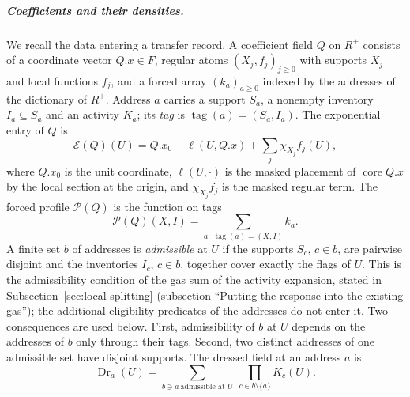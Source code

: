 \subparagraph{Coefficients and their densities.}
We recall the data entering a transfer record. A coefficient field $Q$ on $R^+$
consists of a coordinate vector $Q.x\in F$, regular atoms
$(X_j,f_j)_{j\ge0}$ with supports $X_j$ and local functions $f_j$, and
a forced array $(k_a)_{a\ge0}$ indexed by the addresses of the
dictionary of $R^+$. Address $a$ carries a support $S_a$, a nonempty
inventory $I_a\subseteq S_a$ and an activity $K_a$; its \emph{tag} is
$\operatorname{tag}(a)=(S_a,I_a)$. The exponential entry of $Q$ is
\[
 \mathcal E(Q)(U)=Q.x_0+\ell(U,Q.x)
   +\sum_j\chi_{X_j}f_j(U),
\]
where $Q.x_0$ is the unit coordinate, $\ell(U,\cdot)$ is the masked
placement of $\operatorname{core}Q.x$ by the local section at the
origin, and $\chi_{X_j}f_j$ is the masked regular term. The forced
profile $\mathcal P(Q)$ is the function on tags
\[
 \mathcal P(Q)(X,I)=\sum_{a:\ \operatorname{tag}(a)=(X,I)}k_a .
\]
A finite set $b$ of addresses is \emph{admissible} at $U$ if the
supports $S_c$, $c\in b$, are pairwise disjoint and the inventories
$I_c$, $c\in b$, together cover exactly the flags of $U$. This is the
admissibility condition of the gas sum of the activity expansion,
stated in Subsection~\ref{sec:local-splitting} (subsection ``Putting the
response into the existing gas''); the additional eligibility predicates
of the addresses do not enter it. Two consequences are used below.
First, admissibility of $b$ at $U$ depends on the addresses of $b$ only
through their tags. Second, two distinct addresses of one admissible
set have disjoint supports. The dressed field at an address $a$ is
\[
 \operatorname{Dr}_a(U)=\sum_{b\ni a\ \text{admissible at }U}
            \ \prod_{c\in b\setminus\{a\}}K_c(U).
\]

